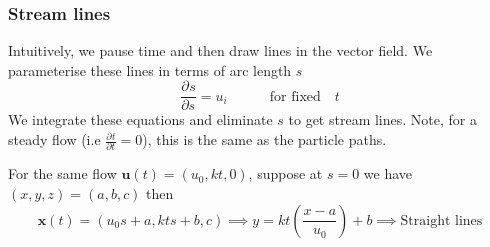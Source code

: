 \documentclass[11pt]{article}
\newcommand*{\pd}[3][]{\ensuremath{\frac{\partial^{#1} {#3}}{\partial {#3}^{#1}}}}
\newenvironment{eg}
    {\begin{mdframed}[backgroundcolor=mylg, roundcorner=5pt, linewidth=0pt]}
    {\end{mdframed}}
\newcommand{\mv}[1]{\textbf{#1}}
\begin{document}
\subsubsection{Stream lines}
Intuitively, we pause time and then draw lines in the vector field. We parameterise these lines in terms of arc length $s$
$$\pd{x_i^p}{s}=u_i \quad\quad\quad \text{for fixed} \quad t$$
We integrate these equations and eliminate $s$ to get stream lines. Note, for a steady flow (i.e $\pd{\mv{u}}{t}=0$), this is the same as the particle paths. 
\begin{eg}
For the same flow $\mv{u}(t)=(u_0,kt,0)$, suppose at $s=0$ we have $(x,y,z)=(a,b,c)$ then
$$\mv{x}(t)=(u_0s+a,kts+b,c)\implies y=kt\left(\frac{x-a}{u_0}\right)+b\implies\text{Straight lines}$$
\end{eg}
\end{document}
